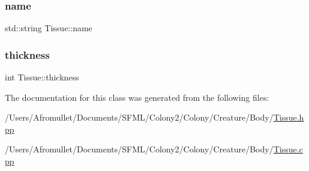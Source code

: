 \mbox{\label{class_tissue_aae2dc58365b59cda8cdf3650c0937010}} 
\subsubsection{\texorpdfstring{name}{name}}
{\footnotesize\ttfamily std\+::string Tissue\+::name\hspace{0.3cm}{\ttfamily [private]}}

\mbox{\label{class_tissue_ad5a7bcb3d7be674cfbe59db370357f6c}} 
\subsubsection{\texorpdfstring{thickness}{thickness}}
{\footnotesize\ttfamily int Tissue\+::thickness\hspace{0.3cm}{\ttfamily [private]}}



The documentation for this class was generated from the following files\+:\begin{DoxyCompactItemize}
\item 
/\+Users/\+Afromullet/\+Documents/\+S\+F\+M\+L/\+Colony2/\+Colony/\+Creature/\+Body/\mbox{\hyperlink{_tissue_8hpp}{Tissue.\+hpp}}\item 
/\+Users/\+Afromullet/\+Documents/\+S\+F\+M\+L/\+Colony2/\+Colony/\+Creature/\+Body/\mbox{\hyperlink{_tissue_8cpp}{Tissue.\+cpp}}\end{DoxyCompactItemize}
